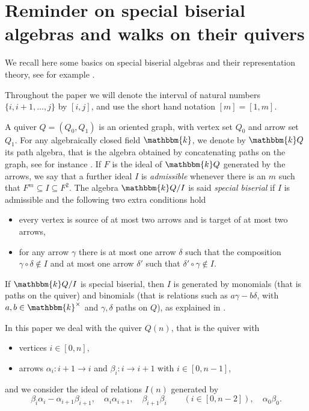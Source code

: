 \documentclass[11pt]{amsart}
\theoremstyle{definition}
\newcommand{\kk}{\mathbbm{k}}
\begin{document}
\section{Reminder on special biserial algebras and walks on their quivers}\label{section:background}
We recall here some basics on special biserial algebras and their representation theory, see for example \cite{SW,WW, Butler-Ringel}.

Throughout the paper we will denote the interval of natural numbers $\{i,i+1,\ldots, j\}$ by  $[i,j]$, and use the short hand notation $[m]=[1,m]$.

A quiver $Q=(Q_0, Q_1)$ is an oriented graph, with vertex set $Q_0$ and arrow set $Q_1$. For any algebraically closed field $\kk$, we denote by $\kk Q$ its path algebra, that is the algebra obtained by concatenating paths on the graph, see for instance \cite[Chapter 2, \S1]{MR2197389}. If $F$ is the ideal of $\kk Q$ generated by the arrows, we say that a further ideal $I$ is \emph{admissible} whenever there is an $m$ such that $F^m\subseteq I\subseteq F^2$. The algebra $\kk Q/I$ is said \emph{special biserial} if $I$ is admissible and the following two extra conditions hold
\begin{itemize}
    \item every vertex is source of at most two arrows and is target of at most two arrows,
    \item for any arrow $\gamma$ there is at most one arrow $\delta$ such that the composition $\gamma\circ \delta\not\in I$ and at most one arrow $\delta'$ such that $\delta'\circ \gamma\not\in I$.  
\end{itemize}
If $\kk Q/I$ is special biserial, then $I$ is generated by monomials (that is paths on the quiver) and binomials (that is relations such as $a\gamma-b\delta$, with $a,b\in\kk^\times$ and $\gamma,\delta$ paths on $Q$), as explained in \cite[Corollary of Lemma 1]{SW}.


In this paper we deal with the quiver $Q(n)$, that is the quiver with 
\begin{itemize}
    \item vertices $i\in[0,n]$, 
        \item arrows $\alpha_i\colon  i+1\to i$ and $\beta_i\colon i\to i+1$ with $i\in[0,n-1]$,
\end{itemize}
and we consider the ideal of relations $I(n)$ generated by 
\[\beta_i\alpha_i-\alpha_{i+1}\beta_{i+1}, \quad \alpha_i\alpha_{i+1},\quad  \beta_{i+1}\beta_i\qquad (i\in[0,n-2]), \quad \alpha_0 \beta_0.
\]
\end{document}
